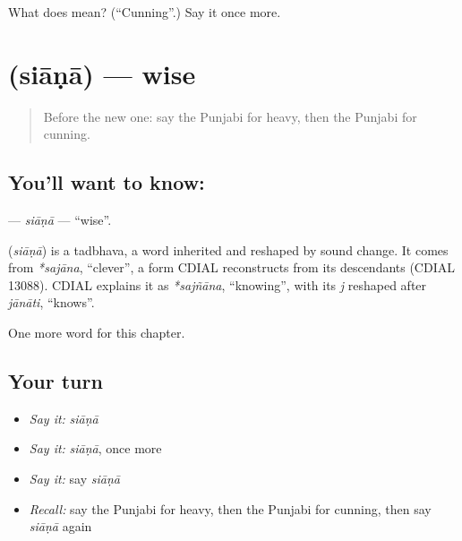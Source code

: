 \begin{tcolorbox}[breakable,colback=teal!4,colframe=teal!35!black,title={Before you move on}]
What does  mean? (\textquotedblleft{}Cunning\textquotedblright{}.) Say it once more.
\end{tcolorbox}
\section[\texorpdfstring{\pa{ਸਿਆਣਾ} (siāṇā)}{ਸਿਆਣਾ (siāṇā)}]{ (siāṇā) — wise}

\label{lesson:PA-C141-siana}



\begin{quote}
Before the new one: say the Punjabi for heavy, then the Punjabi for cunning.
\end{quote}

\subsection*{You'll want to know: }
\textbf{} — \emph{siāṇā} — \textquotedblleft{}wise\textquotedblright{}.

\begin{cousinweb}
\textbf{} (\emph{siāṇā}) is a tadbhava, a word inherited and reshaped by sound change. It comes from \emph{*sajāna}, \textquotedblleft{}clever\textquotedblright{}, a form CDIAL reconstructs from its descendants (CDIAL 13088). CDIAL explains it as \emph{*sajñāna}, \textquotedblleft{}knowing\textquotedblright{}, with its \emph{j} reshaped after \emph{jānāti}, \textquotedblleft{}knows\textquotedblright{}.
\end{cousinweb}

\begin{grammarlens}[title={What you've built}]
One more word for this chapter.
\end{grammarlens}

\subsection*{Your turn}
\begin{itemize}
\raggedright
  \item \emph{Say it:} \emph{siāṇā}
  \item \emph{Say it:} \emph{siāṇā}, once more
  \item \emph{Say it:} say \emph{siāṇā}
  \item \emph{Recall:} say the Punjabi for heavy, then the Punjabi for cunning, then say \emph{siāṇā} again
\end{itemize}

